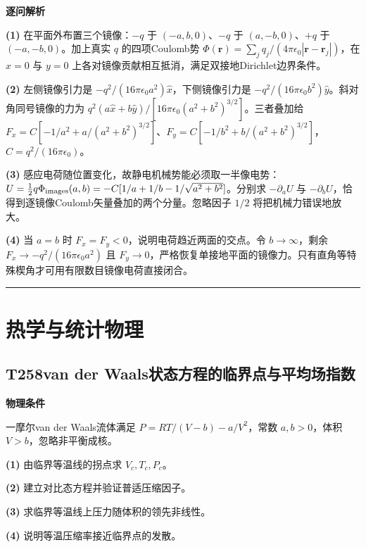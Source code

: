 \documentclass[UTF8,a4paper,11pt,oneside,openany]{ctexbook}
\begin{document}
\par\medskip\noindent\textbf{逐问解析}
\par\noindent\textbf{(1)} 在平面外布置三个镜像：\(-q\) 于 \((-a,b,0)\)、\(-q\) 于 \((a,-b,0)\)、\(+q\) 于 \((-a,-b,0)\)。加上真实 \(q\) 的四项Coulomb势 \(\Phi(\boldsymbol r)=\sum_jq_j/(4\pi\epsilon_0|\boldsymbol r-\boldsymbol r_j|)\)，在 \(x=0\) 与 \(y=0\) 上各对镜像贡献相互抵消，满足双接地Dirichlet边界条件。
\par\noindent\textbf{(2)} 左侧镜像引力是 \(-q^2/(16\pi\epsilon_0a^2)\hat x\)，下侧镜像引力是 \(-q^2/(16\pi\epsilon_0b^2)\hat y\)。斜对角同号镜像的力为 \(q^2(a\hat x+b\hat y)/[16\pi\epsilon_0(a^2+b^2)^{3/2}]\)。三者叠加给 \(F_x=C[-1/a^2+a/(a^2+b^2)^{3/2}]\)、\(F_y=C[-1/b^2+b/(a^2+b^2)^{3/2}]\)，\(C=q^2/(16\pi\epsilon_0)\)。
\par\noindent\textbf{(3)} 感应电荷随位置变化，故静电机械势能必须取一半像电势：\(U=\tfrac12q\Phi_{\rm images}(a,b)=-C[1/a+1/b-1/\sqrt{a^2+b^2}]\)。分别求 \(-\partial_aU\) 与 \(-\partial_bU\)，恰得到逐镜像Coulomb矢量叠加的两个分量。忽略因子 \(1/2\) 将把机械力错误地放大。
\par\noindent\textbf{(4)} 当 \(a=b\) 时 \(F_x=F_y<0\)，说明电荷趋近两面的交点。令 \(b\to\infty\)，剩余 \(F_x\to-q^2/(16\pi\epsilon_0a^2)\) 且 \(F_y\to0\)，严格恢复单接地平面的镜像力。只有直角等特殊楔角才可用有限数目镜像电荷直接闭合。

\par\bigskip\hrule\bigskip
\chapter{热学与统计物理}
\section*{T258\quad van der Waals状态方程的临界点与平均场指数}
\textbf{物理条件}\par 一摩尔van der Waals流体满足 \(P=RT/(V-b)-a/V^2\)，常数 \(a,b>0\)，体积 \(V>b\)，忽略非平衡成核。
\par\noindent\textbf{(1)} 由临界等温线的拐点求 \(V_c,T_c,P_c\)。
\par\noindent\textbf{(2)} 建立对比态方程并验证普适压缩因子。
\par\noindent\textbf{(3)} 求临界等温线上压力随体积的领先非线性。
\par\noindent\textbf{(4)} 说明等温压缩率接近临界点的发散。
\end{document}
